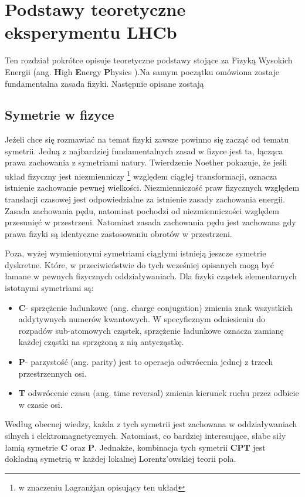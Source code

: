 \chapter{Podstawy teoretyczne eksperymentu LHCb}

Ten rozdział pokrótce opisuje teoretyczne podstawy stojące za Fizyką Wysokich Energii (ang. \textbf{H}igh \textbf{E}nergy \textbf{P}hysics ).Na samym początku omówiona zostaje fundamentalna zasada fizyki. Następnie opisane zostają 

\section{Symetrie w fizyce}
Jeżeli chce się rozmawiać na temat fizyki zawsze powinno się zacząć od tematu symetrii. Jedną z najbardziej fundamentalnych zasad w fizyce jest ta, łącząca prawa zachowania z symetriami natury. Twierdzenie Noether pokazuje, że jeśli układ fizyczny jest niezmienniczy \footnote{w znaczeniu Lagranżjan opisujący ten układ} względem ciągłej transformacji, oznacza istnienie zachowanie pewnej wielkości. Niezmienniczość praw fizycznych względem translacji czasowej jest odpowiedzialne za istnienie zasady zachowania energii. Zasada zachowania pędu, natomiast pochodzi od niezmienniczości względem przesunięć w przestrzeni. Natomiast zasada zachowania pędu jest zachowana gdy prawa fizyki są identyczne zastosowaniu obrotów w przestrzeni. 

Poza, wyżej wymienionymi symetriami ciągłymi istnieją jeszcze symetrie dyskretne. Które, w przeciwieństwie do tych wcześniej opisanych mogą być łamane w pewnych fizycznych oddziaływaniach. Dla fizyki cząstek elementarnych istotnymi symetriami są:

\begin{itemize}
\item \textbf{C}- sprzężenie ładunkowe (ang. charge conjugation) zmienia znak wszystkich addytywnych numerów kwantowych. W specyficznym odniesieniu do rozpadów sub-atomowych cząstek, sprzężenie ładunkowe oznacza zamianę każdej cząstki na sprzężoną z nią antycząstkę.
\item \textbf{P}- parzystość (ang. parity) jest to operacja odwrócenia jednej z trzech przestrzennych osi.
\item \textbf{T} odwrócenie czasu (ang. time reversal) zmienia kierunek ruchu przez odbicie w czasie osi. 
\end{itemize}

Według obecnej wiedzy, każda z tych symetrii jest zachowana w oddziaływaniach silnych i elektromagnetycznych. Natomiast, co bardziej interesujące, słabe siły łamią symetrie \textbf{C} oraz \textbf{P}. Jednakże, kombinacja tych symetrii \textbf{CPT} jest dokładną symetrią w każdej lokalnej Lorentz'owskiej teorii pola.

